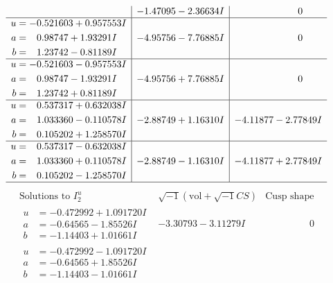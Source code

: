\documentclass[1p]{elsarticle_modified}
\theoremstyle{definition}
\newcommand{\I}{\sqrt{-1}}
\begin{document}
$$\begin{array}{c|c|c}
 & -1.47095 - 2.36634 I & \phantom{-0.000000 } 0 \\ \hline\begin{aligned}
u &= -0.521603 + 0.957553 I \\
a &= \phantom{-}0.98747 + 1.93291 I \\
b &= \phantom{-}1.23742 - 0.81189 I\end{aligned}
 & -4.95756 - 7.76885 I & \phantom{-0.000000 } 0 \\ \hline\begin{aligned}
u &= -0.521603 - 0.957553 I \\
a &= \phantom{-}0.98747 - 1.93291 I \\
b &= \phantom{-}1.23742 + 0.81189 I\end{aligned}
 & -4.95756 + 7.76885 I & \phantom{-0.000000 } 0 \\ \hline\begin{aligned}
u &= \phantom{-}0.537317 + 0.632038 I \\
a &= \phantom{-}1.033360 - 0.110578 I \\
b &= \phantom{-}0.105202 + 1.258570 I\end{aligned}
 & -2.88749 + 1.16310 I & -4.11877 - 2.77849 I \\ \hline\begin{aligned}
u &= \phantom{-}0.537317 - 0.632038 I \\
a &= \phantom{-}1.033360 + 0.110578 I \\
b &= \phantom{-}0.105202 - 1.258570 I\end{aligned}
 & -2.88749 - 1.16310 I & -4.11877 + 2.77849 I\\
 \hline 
 \end{array}$$\newpage$$\begin{array}{c|c|c}  
\text{Solutions to }I^u_{2}& \I (\text{vol} + \sqrt{-1}CS) & \text{Cusp shape}\\
 \hline 
\begin{aligned}
u &= -0.472992 + 1.091720 I \\
a &= -0.64565 - 1.85526 I \\
b &= -1.14403 + 1.01661 I\end{aligned}
 & -3.30793 - 3.11279 I & \phantom{-0.000000 } 0 \\ \hline\begin{aligned}
u &= -0.472992 - 1.091720 I \\
a &= -0.64565 + 1.85526 I \\
b &= -1.14403 - 1.01661 I\end{aligned}

\end{array}$$
\end{document}
